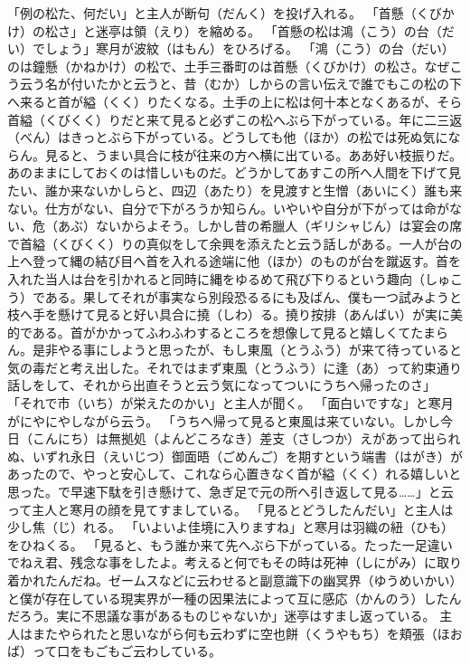\documentclass{book}
\begin{document}
「例の松た、何だい」と主人が断句（だんく）を投げ入れる。
「首懸（くびかけ）の松さ」と迷亭は領（えり）を縮める。
「首懸の松は鴻（こう）の台（だい）でしょう」寒月が波紋（はもん）をひろげる。
「鴻（こう）の台（だい）のは鐘懸（かねかけ）の松で、土手三番町のは首懸（くびかけ）の松さ。なぜこう云う名が付いたかと云うと、昔（むか）しからの言い伝えで誰でもこの松の下へ来ると首が縊（くく）りたくなる。土手の上に松は何十本となくあるが、そら首縊（くびくく）りだと来て見ると必ずこの松へぶら下がっている。年に二三返（べん）はきっとぶら下がっている。どうしても他（ほか）の松では死ぬ気にならん。見ると、うまい具合に枝が往来の方へ横に出ている。ああ好い枝振りだ。あのままにしておくのは惜しいものだ。どうかしてあすこの所へ人間を下げて見たい、誰か来ないかしらと、四辺（あたり）を見渡すと生憎（あいにく）誰も来ない。仕方がない、自分で下がろうか知らん。いやいや自分が下がっては命がない、危（あぶ）ないからよそう。しかし昔の希臘人（ギリシャじん）は宴会の席で首縊（くびくく）りの真似をして余興を添えたと云う話しがある。一人が台の上へ登って縄の結び目へ首を入れる途端に他（ほか）のものが台を蹴返す。首を入れた当人は台を引かれると同時に縄をゆるめて飛び下りるという趣向（しゅこう）である。果してそれが事実なら別段恐るるにも及ばん、僕も一つ試みようと枝へ手を懸けて見ると好い具合に撓（しわ）る。撓り按排（あんばい）が実に美的である。首がかかってふわふわするところを想像して見ると嬉しくてたまらん。是非やる事にしようと思ったが、もし東風（とうふう）が来て待っていると気の毒だと考え出した。それではまず東風（とうふう）に逢（あ）って約束通り話しをして、それから出直そうと云う気になってついにうちへ帰ったのさ」
「それで市（いち）が栄えたのかい」と主人が聞く。
「面白いですな」と寒月がにやにやしながら云う。
「うちへ帰って見ると東風は来ていない。しかし今日（こんにち）は無拠処（よんどころなき）差支（さしつか）えがあって出られぬ、いずれ永日（えいじつ）御面晤（ごめんご）を期すという端書（はがき）があったので、やっと安心して、これなら心置きなく首が縊（くく）れる嬉しいと思った。で早速下駄を引き懸けて、急ぎ足で元の所へ引き返して見る\ldots{}\ldots{}」と云って主人と寒月の顔を見てすましている。
「見るとどうしたんだい」と主人は少し焦（じ）れる。
「いよいよ佳境に入りますね」と寒月は羽織の紐（ひも）をひねくる。
「見ると、もう誰か来て先へぶら下がっている。たった一足違いでねえ君、残念な事をしたよ。考えると何でもその時は死神（しにがみ）に取り着かれたんだね。ゼームスなどに云わせると副意識下の幽冥界（ゆうめいかい）と僕が存在している現実界が一種の因果法によって互に感応（かんのう）したんだろう。実に不思議な事があるものじゃないか」迷亭はすまし返っている。
主人はまたやられたと思いながら何も云わずに空也餅（くうやもち）を頬張（ほおば）って口をもごもご云わしている。
\end{document}
